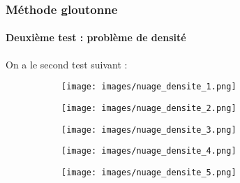 \documentclass{beamer}
\begin{document}
\begin{frame}
	\frametitle{Méthode gloutonne}
	\framesubtitle{Deuxième test : problème de densité}
	On a le second test suivant : 
	\begin{figure}[!htb]
			\centering 
			\begin{subfigure}{0.25\textwidth}
				\centering 
				\texttt{[image: images/nuage\_densite\_1.png]}
			\end{subfigure}
			\hspace*{\fill}
			\begin{subfigure}{0.25\textwidth}
				\centering 
				\texttt{[image: images/nuage\_densite\_2.png]}
			\end{subfigure}
			\hspace*{\fill}
			\begin{subfigure}{0.25\textwidth}
				\centering 
				\texttt{[image: images/nuage\_densite\_3.png]}
			\end{subfigure}
			\hspace*{\fill}
			
		\end{figure}
		\begin{figure}[!htb]

			\centering 
			\hspace*{\fill}
			\begin{subfigure}{0.25\textwidth}
				\centering 
				\texttt{[image: images/nuage\_densite\_4.png]}
			\end{subfigure}
			\hspace*{\fill}
			\begin{subfigure}{0.25\textwidth}
				\centering 
				\texttt{[image: images/nuage\_densite\_5.png]}
			\end{subfigure}
			\hspace*{\fill}
		\end{figure}
\end{frame}
\end{document}
